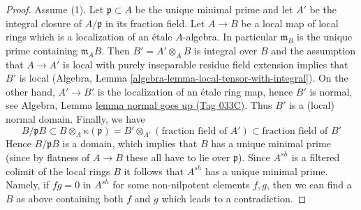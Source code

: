 \documentclass{amsart}
\theoremstyle{plain}
\theoremstyle{definition}
\theoremstyle{remark}
\numberwithin{equation}{subsection}
\begin{document}
\begin{proof}
\medskip\noindent
Assume (1). Let $\mathfrak p \subset A$ be the unique minimal
prime and let $A'$ be the integral closure of $A/\mathfrak p$
in its fraction field. Let $A \to B$ be a local map of local rings which is a
localization of an \'etale $A$-algebra. In particular $\mathfrak m_B$
is the unique prime containing $\mathfrak m_AB$. Then $B' = A' \otimes_A B$
is integral over $B$ and the assumption that $A \to A'$ is local
with purely inseparable residue field extension implies that $B'$
is local (Algebra, Lemma \ref{algebra-lemma-local-tensor-with-integral}).
On the other hand, $A' \to B'$ is the localization
of an \'etale ring map, hence $B'$ is normal, see
Algebra, Lemma \href{https://stacks.math.columbia.edu/tag/033C}{lemma normal goes up (Tag 033C)}.
Thus $B'$ is a (local) normal domain. Finally, we have
$$
B/\mathfrak pB \subset B \otimes_A \kappa(\mathfrak p)
= B' \otimes_{A'} (\text{fraction field of }A') \subset
\text{fraction field of }B'
$$
Hence $B/\mathfrak pB$ is a domain, which implies that $B$ has a unique
minimal prime (since by flatness of $A \to B$ these all have to lie
over $\mathfrak p$). Since $A^{sh}$ is a filtered colimit of
the local rings $B$ it follows that $A^{sh}$ has a unique minimal prime.
Namely, if $fg = 0$ in $A^{sh}$ for some non-nilpotent elements
$f, g$, then we can find a $B$ as above containing both $f$ and $g$
which leads to a contradiction.
\end{proof}
\end{document}
